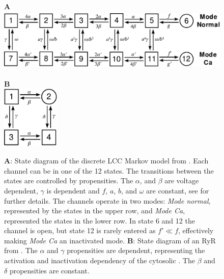 \renewcommand{\figheight}{3cm}
\begin{figure}[t]
  \centering
  \begin{minipage}{0.79\linewidth}
     \large \textbf{A}\\[0.5em]
    \includegraphics[height=\figheight]{chapters/hake/pdf/Jafri_1998_LCC_model}
  \end{minipage}
  \begin{minipage}{0.2\linewidth}
     \large \textbf{B}\\[0.5em]
    \includegraphics[height=\figheight]{chapters/hake/pdf/Stern_1999_RyR_model}
  \end{minipage}
\caption{\textbf{A}: State diagram of the discrete LCC Markov model from \citet{JafriRiceWinslow1998}. Each channel can be in one of the 12 states.  The transitions between the states are controlled by propensities. The $\alpha$, and $\beta$ are voltage dependent, $\gamma$ is \CaC dependent and $f$, $a$, $b$, and $\omega$ are constant, see \citet{JafriRiceWinslow1998} for further details. The channels operate in two modes: \textit{Mode normal}, represented by the states in the upper row, and \textit{Mode Ca}, represented the states in the lower row. In state 6 and 12 the channel is open, but state 12 is rarely entered as $f'\ll{}f$, effectively making \textit{Mode Ca} an inactivated mode.
\textbf{B}: State diagram of an RyR from \citet{SternSongChengEtAl1999}. The $\alpha$ and $\gamma$ propensities are \Ca dependent, representing the activation and inactivation dependency of the cytosolic \CaC. The $\beta$ and $\delta$ propensities are constant.}
\label{fig:markov-models}
\end{figure}

